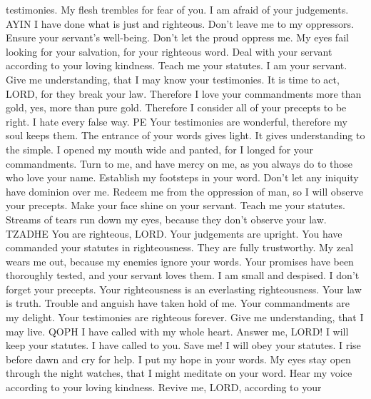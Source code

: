 testimonies.  My flesh trembles for fear of you. I am
afraid of your judgements. AYIN  I have done what is just
and righteous. Don't leave me to my oppressors.  Ensure
your servant's well-being. Don't let the proud oppress me.
 My eyes fail looking for your salvation, for your
righteous word.  Deal with your servant according to your
loving kindness. Teach me your statutes.  I am your
servant. Give me understanding, that I may know your testimonies.
 It is time to act, LORD, for they break your law.
 Therefore I love your commandments more than gold, yes,
more than pure gold.  Therefore I consider all of your
precepts to be right. I hate every false way. PE  Your
testimonies are wonderful, therefore my soul keeps them. 
The entrance of your words gives light. It gives understanding to the
simple.  I opened my mouth wide and panted, for I longed
for your commandments.  Turn to me, and have mercy on me,
as you always do to those who love your name.  Establish
my footsteps in your word. Don't let any iniquity have dominion over me.
 Redeem me from the oppression of man, so I will observe
your precepts.  Make your face shine on your servant.
Teach me your statutes.  Streams of tears run down my
eyes, because they don't observe your law. TZADHE  You are
righteous, LORD. Your judgements are upright.  You have
commanded your statutes in righteousness. They are fully trustworthy.
 My zeal wears me out, because my enemies ignore your
words.  Your promises have been thoroughly tested, and
your servant loves them.  I am small and despised. I don't
forget your precepts.  Your righteousness is an
everlasting righteousness. Your law is truth.  Trouble and
anguish have taken hold of me. Your commandments are my delight.
 Your testimonies are righteous forever. Give me
understanding, that I may live. QOPH  I have called with
my whole heart. Answer me, LORD! I will keep your statutes.
 I have called to you. Save me! I will obey your statutes.
 I rise before dawn and cry for help. I put my hope in
your words.  My eyes stay open through the night watches,
that I might meditate on your word.  Hear my voice
according to your loving kindness. Revive me, LORD, according to your
